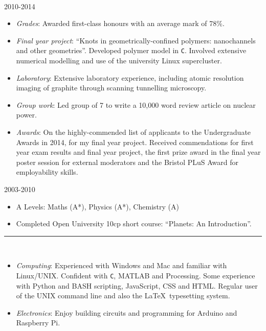 \documentclass[10pt]{article}
\begin{document}
\\
  \hfill \textsc{2010-2014}
\begin{itemize}
              \item \emph{Grades}: Awarded first-class honours with an average mark of 78\%.
               \item \emph{Final year project}: ``Knots in geometrically-confined  polymers: nanochannels and other geometries''. Developed polymer model in {\tt C}. Involved extensive numerical modelling and use of the university Linux supercluster. 
		  \item \emph{Laboratory}: Extensive laboratory experience, including atomic resolution imaging of graphite through scanning tunnelling microscopy.
		  \item \emph{Group work}: Led group of 7 to write a 10,000 word review article on nuclear power.
              \item \emph{Awards}: On the highly-commended list of applicants to the Undergraduate Awards in 2014, for my final year project. Received commendations for first year exam results and final year project, the first prize award in the final year poster session for external moderators and the Bristol PLuS Award for employability skills.
 \end{itemize}



 \hfill 2003-2010
\begin{itemize}
	\item A Levels: Maths (A*), Physics (A*), Chemistry (A)
	\item Completed Open University 10cp short course: ``Planets: An Introduction''.
\end{itemize}

\noindent\rule{505pt}{0.6pt}\\
	
\begin{itemize}
		\item {\it Computing}: Experienced with Windows and Mac and familiar with Linux/UNIX. Confident with {\tt C}, MATLAB and Processing. Some experience with Python and BASH scripting, JavaScript,  CSS and  HTML. Regular user of the UNIX command line and also the \LaTeX~typesetting system. 
		\item {\it Electronics}: Enjoy building circuits and programming for Arduino and Raspberry Pi.
\end{itemize}
\end{document}
